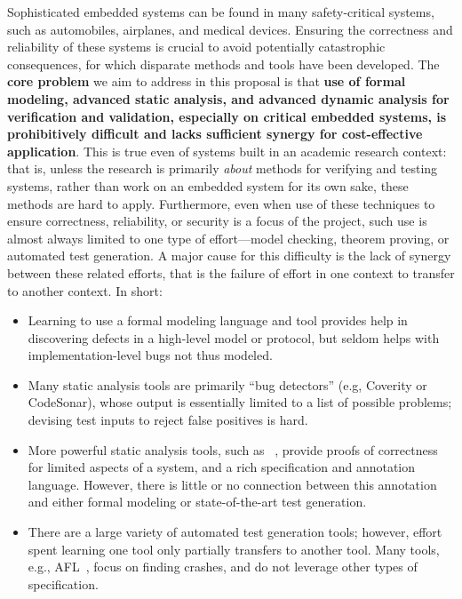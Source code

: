 Sophisticated embedded systems can be found in many safety-critical systems, such as automobiles, airplanes, and medical devices.
Ensuring the correctness and reliability of these systems is crucial to avoid potentially catastrophic consequences, for which disparate methods and tools have been developed.
The \textbf{core problem} we aim to address in this proposal is that \textbf{use of formal modeling, advanced static analysis, and advanced dynamic analysis for verification and validation, especially on critical embedded systems, is prohibitively difficult and lacks sufficient synergy for cost-effective application}.
This is true even of systems built in an academic research context: that is, unless the research is primarily \emph{about} methods for verifying and testing systems, rather than work on an embedded system for its own sake, these methods are hard to apply.
Furthermore, even when use of these techniques to ensure correctness, reliability, or security is a focus of the project, such use is almost always limited to one type of effort---model checking, theorem proving, or automated test generation.
A major cause for this difficulty is the lack of synergy between these related efforts, that is the failure of effort in one context to transfer to another context.
In short:

\begin{itemize}[labelsep=3pt,leftmargin=12pt]
\item Learning to use a formal modeling language and tool
 provides help in discovering defects in a high-level model or protocol, but seldom helps with implementation-level bugs not thus modeled.
\item Many static analysis tools are primarily ``bug detectors'' (e.g, Coverity or CodeSonar), whose output is essentially limited to a list of possible problems; devising test inputs to reject false positives is hard.
\item More powerful static analysis tools, such as \framac~\cite{KKP2015:FAC}, provide proofs of correctness for limited aspects of a system, and a rich specification and annotation language.  However, there is little or no connection between this annotation and either formal modeling or state-of-the-art test generation.
\item There are a large variety of automated test generation tools; however, effort spent learning one tool only partially transfers to another tool.  Many tools, e.g., AFL~\cite{aflfuzz}, focus on finding crashes, and do not leverage  other types of specification.
\end{itemize}

